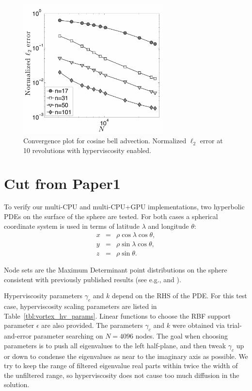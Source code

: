 \begin{figure}[htbp]
\begin{center}
\includegraphics[width=3in]{figures/paper1/figures/cosine_bell/convergence_plot_hv.pdf}
\caption{Convergence plot for cosine bell advection. Normalized $\ell_2$ error at 10 revolutions with hyperviscosity enabled. }
\label{fig:conv_cosine_bell}
\end{center}
\end{figure}


\section{Cut from Paper1}
To verify our multi-CPU and multi-CPU+GPU implementations, two hyperbolic PDEs on the surface of the sphere are tested. For both cases a spherical coordinate system is used in terms of latitude $\lambda$ and longitude $\theta$:
\begin{eqnarray*} 
x & = & \rho \cos \lambda \cos \theta, 	\\
y & = & \rho \sin \lambda \cos \theta, 		\\
z & = & \rho \sin \theta.		
\end{eqnarray*}

Node sets are the Maximum Determinant point distributions on the sphere \cite{Sloan2003} consistent with previously published results (see e.g., \cite{Flyer2007} and \cite{Fornberg2011b}).

Hyperviscosity parameters $\gamma_c$ and $k$ depend on the RHS of the PDE. 
For this test case, hyperviscosity scaling parameters are listed in Table~\ref{tbl:vortex_hv_params}. Linear functions to choose the RBF support parameter $\epsilon$ are also provided. The parameters $\gamma_c$ and $k$ were obtained via trial-and-error parameter searching on $N=4096$ nodes. The goal when choosing parameters is to push all eigenvalues to the left half-plane, and then tweak $\gamma_c$ up or down to condense the eigenvalues as near to the imaginary axis as possible. We try to keep the range of filtered eigenvalue real parts within twice the width of the unfiltered range, so hyperviscosity does not cause too much diffusion in the solution. 

